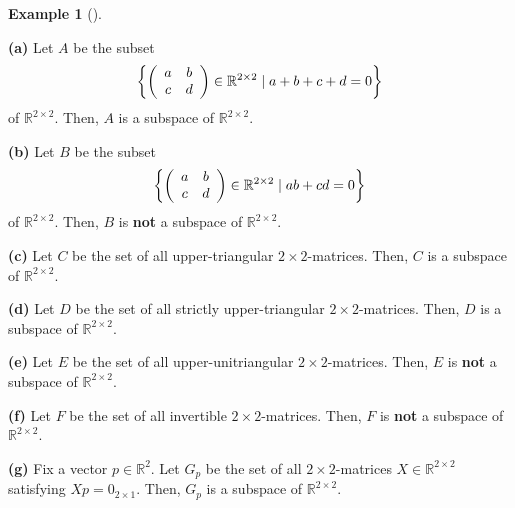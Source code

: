 \documentclass[numbers=enddot,12pt,final,onecolumn,notitlepage]{scrartcl}%
\theoremstyle{definition}
\newtheorem{exam}[theo]{Example}
\newenvironment{example}[1][]
{\begin{exam}[#1]\begin{leftbar}}
{\end{leftbar}\end{exam}}
\begin{document}
\begin{example}
\label{exam.subspace.R22} \textbf{(a)} Let $A$ be the subset
\[
\left\{  \left(
\begin{array}
[c]{cc}%
a & b\\
c & d
\end{array}
\right)  \in\mathbb{R}^{2 \times2} \mid a+b+c+d = 0 \right\}
\]
of $\mathbb{R}^{2\times2}$. Then, $A$ is a subspace of $\mathbb{R}^{2\times2}$.

\textbf{(b)} Let $B$ be the subset
\[
\left\{  \left(
\begin{array}
[c]{cc}%
a & b\\
c & d
\end{array}
\right)  \in\mathbb{R}^{2 \times2} \mid ab+cd = 0 \right\}
\]
of $\mathbb{R}^{2\times2}$. Then, $B$ is \textbf{not} a subspace of
$\mathbb{R}^{2\times2}$.

\textbf{(c)} Let $C$ be the set of all upper-triangular $2 \times2$-matrices.
Then, $C$ is a subspace of $\mathbb{R}^{2 \times2}$.

\textbf{(d)} Let $D$ be the set of all strictly upper-triangular $2 \times
2$-matrices. Then, $D$ is a subspace of $\mathbb{R}^{2 \times2}$.

\textbf{(e)} Let $E$ be the set of all upper-unitriangular $2 \times
2$-matrices. Then, $E$ is \textbf{not} a subspace of $\mathbb{R}^{2 \times2}$.

\textbf{(f)} Let $F$ be the set of all invertible $2 \times2$-matrices. Then,
$F$ is \textbf{not} a subspace of $\mathbb{R}^{2 \times2}$.

\textbf{(g)} Fix a vector $p\in\mathbb{R}^{2}$. Let $G_{p}$ be the set of all
$2\times2$-matrices $X\in\mathbb{R}^{2\times2}$ satisfying $Xp=0_{2\times1}$.
Then, $G_{p}$ is a subspace of $\mathbb{R}^{2\times2}$.
\end{example}
\end{document}
